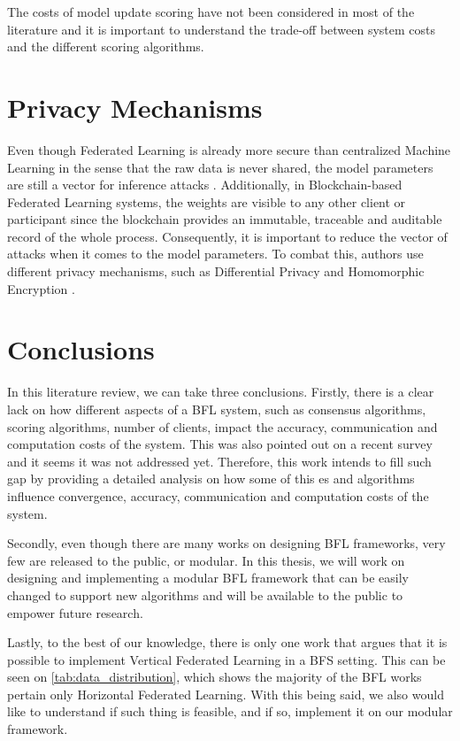 The costs of model update scoring have not been considered in most of the literature and it is important to understand the trade-off between system costs and the different scoring algorithms\cite{9403374, 10.48550/arxiv.2110.02182}.

\section{Privacy Mechanisms}\label{related_work:privacy}

Even though Federated Learning is already more secure than centralized Machine Learning in the sense that the raw data is never shared, the model parameters are still a vector for inference attacks \cite{10.1145/3298981}. Additionally, in Blockchain-based Federated Learning systems, the weights are visible to any other client or participant since the blockchain provides an immutable, traceable and auditable record of the whole process. Consequently, it is important to reduce the vector of attacks when it comes to the model parameters. To combat this, authors use different privacy mechanisms, such as Differential Privacy \cite{10.48550/arxiv.2007.03856, Peyvandi2022, 9170559} and Homomorphic Encryption \cite{8945913, 8894364}.

\section{Conclusions}\label{related_work:conclusions}

In this literature review, we can take three conclusions. Firstly, there is a clear lack on how different aspects of a BFL system, such as consensus algorithms, scoring algorithms, number of clients, impact the accuracy, communication and computation costs of the system. This was also pointed out on a recent survey \cite{9403374} and it seems it was not addressed yet. Therefore, this work intends to fill such gap by providing a detailed analysis on how some of this es and algorithms influence convergence, accuracy, communication and computation costs of the system.

Secondly, even though there are many works on designing BFL frameworks, very few are released to the public, or modular. In this thesis, we will work on designing and implementing a modular BFL framework that can be easily changed to support new algorithms and will be available to the public to empower future research.

Lastly, to the best of our knowledge, there is only one work that argues that it is possible to implement Vertical Federated Learning in a BFS setting. This can be seen on \autoref{tab:data_distribution}, which shows the majority of the BFL works pertain only Horizontal Federated Learning. With this being said, we also would like to understand if such thing is feasible, and if so, implement it on our modular framework.





